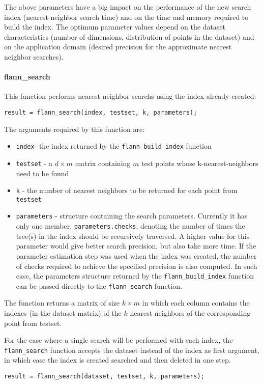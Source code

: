 \documentclass[letter,10pt]{article}
\begin{document}
The above parameters have a big impact on the performance of the new search index (nearest-neighbor search time) and on the time and memory required to build the index. The optimum parameter values depend on the dataset characteristics (number of dimensions, distribution of points in the dataset) and on the application domain (desired precision for the approximate nearest neighbor searches).


\paragraph{flann\_search}

This function performs nearest-neighbor searchs using the index already created:
\begin{Verbatim}
result = flann_search(index, testset, k, parameters);
\end{Verbatim}

The arguments required by this function are:
\begin{itemize}
 \item \texttt{index}- the index returned by the \texttt{flann\_build\_index} function
 \item \texttt{testset} - a $d \times m$ matrix containing $m$ test points whose k-nearest-neighbors need to be found
 \item \texttt{k} - the number of nearest neighbors to be returned for each point from \texttt{testset}
\item \texttt{parameters} - structure containing the search parameters. Currently it has only one member, \texttt{parameters.checks}, denoting the number of times the tree(s) in the index should be recursively traversed. A higher value for this parameter would give better search precision, but also take more time. If the parameter estimation step was used when the index was created, the number of checks required to achieve the specified precision is also computed. In such case, the parameters structure returned by the \texttt{flann\_build\_index} function can be passed directly to the \texttt{flann\_search} function.
\end{itemize}

The function returns a matrix of size $k \times m$ in which each column contains the indexes (in the dataset matrix) of the $k$ nearest neighbors of the corresponding point from testset.

For the case where a single search will be performed with each index, the \texttt{flann\_search} function accepts the dataset instead of the index as first argument, in which case the index is created searched and then deleted in one step.
\begin{Verbatim}
result = flann_search(dataset, testset, k, parameters);
\end{Verbatim}
\end{document}
